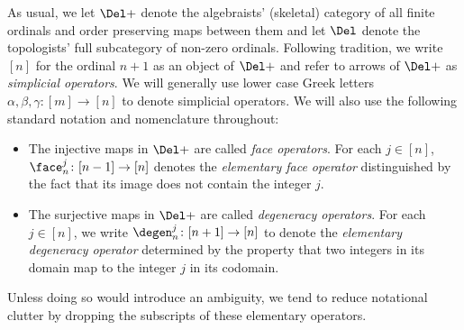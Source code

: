     \begin{ntn}\label{ntn:simp.op}
        As usual, we let $\Del+$ denote the algebraists' (skeletal) category of all finite ordinals and order preserving maps between them and let $\Del$ denote the topologists' full subcategory of non-zero ordinals. Following tradition, we write $[n]$ for the ordinal $n+1$ as an object of $\Del+$ and refer to arrows of $\Del+$ as {\em simplicial operators}.  We will generally use lower case Greek letters $\alpha,\beta,\gamma\colon[m]\to[n]$ to denote simplicial operators. We will also use the following standard notation and nomenclature throughout:
        \begin{itemize}
            \item The injective maps in $\Del+$ are called {\em face operators}. For each $j\in[n]$,  $\face_n^j\colon[n-1]\to[n]$ denotes the {\em elementary face operator\/} distinguished by the fact that its image does not contain the integer $j$.
            \item The surjective maps in $\Del+$ are called {\em degeneracy operators}. For each $j\in[n]$, we write $\degen_n^j\colon[n+1]\to[n]$ to denote the {\em elementary degeneracy operator} determined by the property that two integers in its domain map to the integer $j$ in its codomain.
        \end{itemize}
        Unless doing so would introduce an ambiguity, we tend to reduce notational clutter by dropping the subscripts of these elementary operators.
    \end{ntn}

